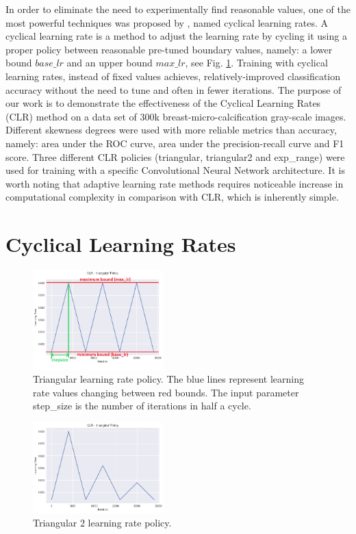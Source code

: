 \documentclass[journal, a4paper]{IEEEtran}
\begin{document}
	In order to eliminate the need to experimentally find reasonable values, one of the most powerful techniques was proposed by \cite{CLR}, named cyclical learning rates. A cyclical learning rate is a method to adjust the learning rate by cycling it using a proper policy between reasonable pre-tuned boundary values, namely: a lower bound $base\_lr$ and an upper bound $max\_lr$, see Fig. \ref{fig:triang}. Training with cyclical learning rates, instead of fixed values achieves, relatively-improved classification accuracy without the need to tune and often in fewer iterations.
The purpose of our work is to demonstrate the effectiveness of the Cyclical Learning Rates (CLR) method on a data set of 300k breast-micro-calcification  gray-scale images.
	Different skewness degrees were used with more reliable metrics than accuracy, namely: area under the ROC curve, area under the precision-recall curve and F1 score.
	Three different CLR policies (triangular, triangular2 and exp\_range) were used for training with a specific Convolutional Neural Network architecture.
	It is worth noting that adaptive learning rate methods requires noticeable increase in computational complexity in comparison with CLR, which is inherently simple.

\section{Cyclical Learning Rates}
	
\begin{figure}[h!]
    \centering
    \includegraphics[width=0.45\textwidth]{images/it_lr_triangular.png} 
    \caption{Triangular learning rate policy. The blue lines represent learning rate values changing between red bounds. The input parameter step\_size is the number of iterations in half a cycle.}
    \label{fig:triang}
\end{figure}    
\begin{figure}[h!]
    \centering
    \includegraphics[width=0.45\textwidth]{images/it_lr_triang2.png} 
    \caption{Triangular 2 learning rate policy.}
    \label{fig:triang2}
\end{figure}    
\end{document}

